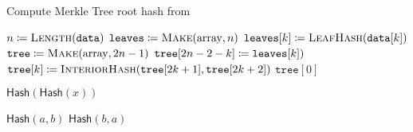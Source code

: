 \begin{algorithm}[t]
\caption{Compute Merkle Tree root hash from~\cite{MerkleTreeOZ}}
\label{alg:merkle_tree_oz}
\begin{algorithmic}[1]
    \State $n \coloneqq{} \textsc{Length}(\texttt{data})$
    \State $\texttt{leaves} \coloneqq{} \textsc{Make}(\text{array}, n)$
        \State $\texttt{leaves}[k] \coloneqq{}
            \textsc{LeafHash}(\texttt{data}[k])$
    \EndFor
    \State $\texttt{tree} \coloneqq{} \textsc{Make}(\text{array}, 2n-1)$
        \State $\texttt{tree}[2n-2-k] \coloneqq{} \texttt{leaves}[k])$
    \EndFor
        \State $\texttt{tree}[k] \coloneqq{}
            \textsc{InteriorHash}(\texttt{tree}[2k+1],\texttt{tree}[2k+2])$
    \EndFor
    \State \Return $\texttt{tree}[0]$
\EndProcedure

\State
{}
    \State \Return $\textsf{Hash}(\textsf{Hash}(x))$
\EndProcedure

\State
{}
        \State \Return $\textsf{Hash}(a, b)$
    \Else
        \State \Return $\textsf{Hash}(b, a)$
    \EndIf
\EndProcedure
\end{algorithmic}
\end{algorithm}
